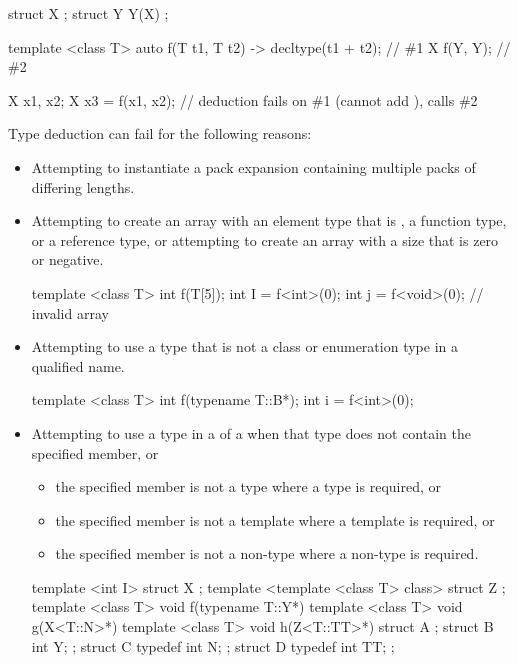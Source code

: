 \pnum
\begin{example}
\begin{codeblock}
struct X { };
struct Y {
  Y(X) {}
};

template <class T> auto f(T t1, T t2) -> decltype(t1 + t2);     // \#1
X f(Y, Y);                                                      // \#2

X x1, x2;
X x3 = f(x1, x2);   // deduction fails on \#1 (cannot add ), calls \#2
\end{codeblock}
\end{example}

\pnum
\begin{note}
Type deduction can fail for the following reasons:
\begin{itemize}
\item Attempting to instantiate a pack expansion containing multiple packs of differing lengths.
\item
Attempting to create an array with an element type that is , a
function type, or a reference type, or attempting
to create an array with a size that is zero or negative.
\begin{example}
\begin{codeblock}
template <class T> int f(T[5]);
int I = f<int>(0);
int j = f<void>(0);             // invalid array
\end{codeblock}
\end{example}
\item
Attempting to use a type that is not a class or enumeration type in a qualified name.
\begin{example}
\begin{codeblock}
template <class T> int f(typename T::B*);
int i = f<int>(0);
\end{codeblock}
\end{example}
\item
Attempting to use a type in a  of a
 when
that type does not contain the specified member, or
\begin{itemize}
\item
the specified member is not a type where a type is required, or
\item
the specified member is not a template where a template is required, or
\item
the specified member is not a non-type where a non-type is required.
\end{itemize}
\begin{example}
\begin{codeblock}
template <int I> struct X { };
template <template <class T> class> struct Z { };
template <class T> void f(typename T::Y*) {}
template <class T> void g(X<T::N>*) {}
template <class T> void h(Z<T::TT>*) {}
struct A {};
struct B { int Y; };
struct C {
  typedef int N;
};
struct D {
  typedef int TT;
};


\end{codeblock}
\end{example}
\end{itemize}
\end{note}
